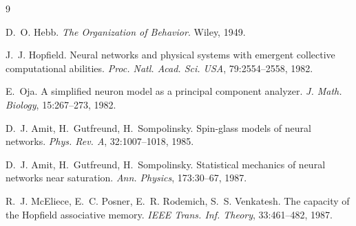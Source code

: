 \documentclass[11pt,a4paper]{article}
\begin{document}
\begin{thebibliography}{9}

D.~O. Hebb.
\newblock \emph{The Organization of Behavior}.
\newblock Wiley, 1949.

J.~J. Hopfield.
\newblock Neural networks and physical systems with emergent collective computational abilities.
\newblock \emph{Proc. Natl. Acad. Sci. USA}, 79:2554--2558, 1982.

E.~Oja.
\newblock A simplified neuron model as a principal component analyzer.
\newblock \emph{J. Math. Biology}, 15:267--273, 1982.

D.~J. Amit, H.~Gutfreund, H.~Sompolinsky.
\newblock Spin-glass models of neural networks.
\newblock \emph{Phys. Rev. A}, 32:1007--1018, 1985.

D.~J. Amit, H.~Gutfreund, H.~Sompolinsky.
\newblock Statistical mechanics of neural networks near saturation.
\newblock \emph{Ann. Physics}, 173:30--67, 1987.

R.~J. McEliece, E.~C. Posner, E.~R. Rodemich, S.~S. Venkatesh.
\newblock The capacity of the Hopfield associative memory.
\newblock \emph{IEEE Trans. Inf. Theory}, 33:461--482, 1987.

\end{thebibliography}
\end{document}
